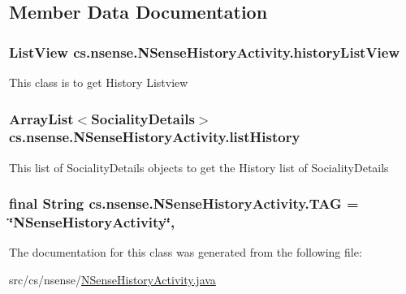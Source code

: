\subsection{Member Data Documentation}
\hypertarget{classcs_1_1nsense_1_1_n_sense_history_activity_a1611194c8ab199089bbca866bef6d908}{
\subsubsection[{history\-List\-View}]{\setlength{\rightskip}{0pt plus 5cm}List\-View cs.\-nsense.\-N\-Sense\-History\-Activity.\-history\-List\-View\hspace{0.3cm}{\ttfamily [private]}}}\label{classcs_1_1nsense_1_1_n_sense_history_activity_a1611194c8ab199089bbca866bef6d908}
This class is to get History Listview \hypertarget{classcs_1_1nsense_1_1_n_sense_history_activity_aefa56a8805849b71eff327c6586b133f}{
\subsubsection[{list\-History}]{\setlength{\rightskip}{0pt plus 5cm}Array\-List$<${\bf Sociality\-Details}$>$ cs.\-nsense.\-N\-Sense\-History\-Activity.\-list\-History\hspace{0.3cm}{\ttfamily [static]}}}\label{classcs_1_1nsense_1_1_n_sense_history_activity_aefa56a8805849b71eff327c6586b133f}
This list of Sociality\-Details objects to get the History list of Sociality\-Details \hypertarget{classcs_1_1nsense_1_1_n_sense_history_activity_ade61951e4413af395d38d77e2bc222c0}{
\subsubsection[{T\-A\-G}]{\setlength{\rightskip}{0pt plus 5cm}final String cs.\-nsense.\-N\-Sense\-History\-Activity.\-T\-A\-G = \char`\"{}N\-Sense\-History\-Activity\char`\"{}\hspace{0.3cm}{\ttfamily [static]}, {\ttfamily [private]}}}\label{classcs_1_1nsense_1_1_n_sense_history_activity_ade61951e4413af395d38d77e2bc222c0}


The documentation for this class was generated from the following file\-:\begin{DoxyCompactItemize}
\item 
src/cs/nsense/\hyperlink{_n_sense_history_activity_8java}{N\-Sense\-History\-Activity.\-java}\end{DoxyCompactItemize}
